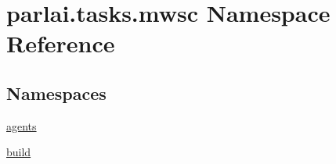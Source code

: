 \hypertarget{namespaceparlai_1_1tasks_1_1mwsc}{}\section{parlai.\+tasks.\+mwsc Namespace Reference}
\label{namespaceparlai_1_1tasks_1_1mwsc}
\subsection*{Namespaces}
\begin{DoxyCompactItemize}
\item 
 \hyperlink{namespaceparlai_1_1tasks_1_1mwsc_1_1agents}{agents}
\item 
 \hyperlink{namespaceparlai_1_1tasks_1_1mwsc_1_1build}{build}
\end{DoxyCompactItemize}
